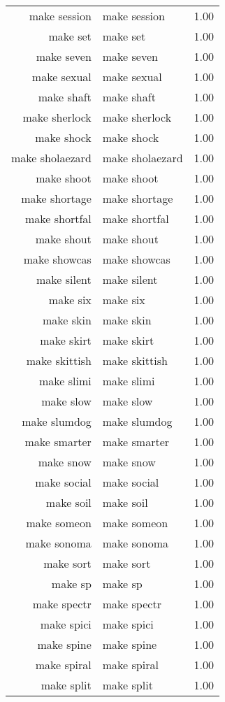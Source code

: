 \begin{table}[ht]
\begin{tabular}{rlr}
  make session & make session & 1.00 \\ 
  make set & make set & 1.00 \\ 
  make seven & make seven & 1.00 \\ 
  make sexual & make sexual & 1.00 \\ 
  make shaft & make shaft & 1.00 \\ 
  make sherlock & make sherlock & 1.00 \\ 
  make shock & make shock & 1.00 \\ 
  make sholaezard & make sholaezard & 1.00 \\ 
  make shoot & make shoot & 1.00 \\ 
  make shortage & make shortage & 1.00 \\ 
  make shortfal & make shortfal & 1.00 \\ 
  make shout & make shout & 1.00 \\ 
  make showcas & make showcas & 1.00 \\ 
  make silent & make silent & 1.00 \\ 
  make six & make six & 1.00 \\ 
  make skin & make skin & 1.00 \\ 
  make skirt & make skirt & 1.00 \\ 
  make skittish & make skittish & 1.00 \\ 
  make slimi & make slimi & 1.00 \\ 
  make slow & make slow & 1.00 \\ 
  make slumdog & make slumdog & 1.00 \\ 
  make smarter & make smarter & 1.00 \\ 
  make snow & make snow & 1.00 \\ 
  make social & make social & 1.00 \\ 
  make soil & make soil & 1.00 \\ 
  make someon & make someon & 1.00 \\ 
  make sonoma & make sonoma & 1.00 \\ 
  make sort & make sort & 1.00 \\ 
  make sp & make sp & 1.00 \\ 
  make spectr & make spectr & 1.00 \\ 
  make spici & make spici & 1.00 \\ 
  make spine & make spine & 1.00 \\ 
  make spiral & make spiral & 1.00 \\ 
  make split & make split & 1.00 \\ 

\end{tabular}
\end{table}
